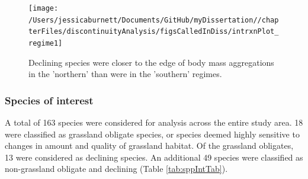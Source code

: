 \documentclass[12pt,twoside,openany]{reedthesis}
\begin{document}
\begin{figure}[bth]

{\centering \texttt{[image: /Users/jessicaburnett/Documents/GitHub/myDissertation//chapterFiles/discontinuityAnalysis/figsCalledInDiss/intrxnPlot\_regime1]} 

}

\caption{Declining species were closer to the edge of body mass aggregations in the 'northern' than were in the 'southern' regimes.}\label{fig:intrxnPlot-regime}
\end{figure}
\hypertarget{species-of-interest}{%
\subsubsection{Species of interest}\label{species-of-interest}}

A total of 163 species were considered for analysis across the entire study area. 18 were classified as grassland obligate species, or species deemed highly sensitive to changes in amount and quality of grassland habitat. Of the grassland obligates, 13 were considered as declining species. An additional 49 species were classified as non-grassland obligate and declining (Table \ref{tab:sppIntTab}).
\end{document}
